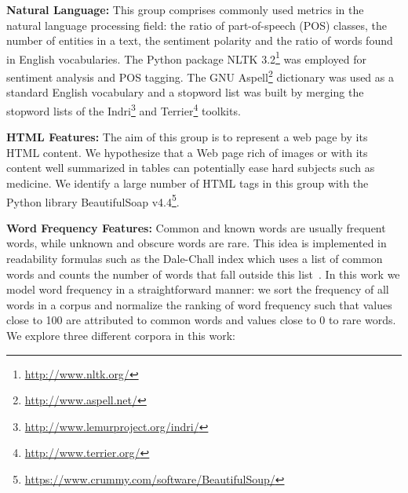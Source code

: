 \textbf{Natural Language:}
This group comprises commonly used metrics in the natural language processing field: the ratio of part-of-speech (POS) classes, the number of entities in a text, the sentiment polarity and the ratio of words found in English vocabularies. The Python package NLTK 3.2\footnote{\url{http://www.nltk.org/}} was employed for sentiment analysis and POS tagging. The GNU Aspell\footnote{\url{http://www.aspell.net/}} dictionary was used as a standard English vocabulary and a stopword list was built by merging the stopword
lists of the Indri\footnote{\url{http://www.lemurproject.org/indri/}} and Terrier\footnote{\url{http://www.terrier.org/}} toolkits. 

\textbf{HTML Features:}
The aim of this group is to represent a web page by its HTML content.
We hypothesize that a Web page rich of images or with its content well summarized in tables can potentially ease hard subjects such as medicine. 
We identify a large number of HTML tags in this group with the Python library BeautifulSoap v4.4\footnote{\url{https://www.crummy.com/software/BeautifulSoup/}}.

\textbf{Word Frequency Features:}
Common and known words are usually frequent words, while unknown and obscure words are rare. This idea is implemented in readability formulas such as the Dale-Chall index which uses a list of common words and counts the number of words that fall outside this list~\cite{dale48}.
In this work we model word frequency in a straightforward manner: we sort the frequency of all words in a corpus and normalize the ranking of word frequency such that values close to 100 are attributed to common words and values close to 0 to rare words. 
We explore three different corpora in this work:

